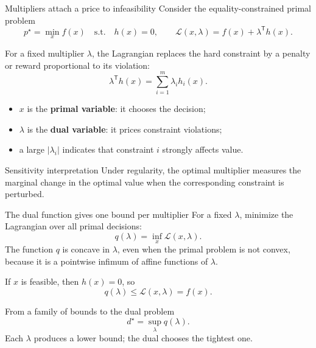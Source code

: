 \documentclass[aspectratio=169,11pt]{beamer}
\newcommand{\trans}{^{\mathsf T}}
\begin{document}
\begin{frame}{Multipliers attach a price to infeasibility}
  Consider the equality-constrained primal problem
  \[
    p^\star=\min_x f(x)
    \quad\text{s.t.}\quad h(x)=0,
    \qquad \mathcal L(x,\lambda)=f(x)+\lambda\trans h(x).
  \]

  For a fixed multiplier $\lambda$, the Lagrangian replaces the hard constraint
  by a penalty or reward proportional to its violation:
  \[
    \lambda\trans h(x)=\sum_{i=1}^m\lambda_i h_i(x).
  \]

  \begin{itemize}
    \item $x$ is the \textbf{primal variable}: it chooses the decision;
    \item $\lambda$ is the \textbf{dual variable}: it prices constraint violations;
    \item a large $|\lambda_i|$ indicates that constraint $i$ strongly affects value.
  \end{itemize}

  \begin{block}{Sensitivity interpretation}
    Under regularity, the optimal multiplier measures the marginal change in the
    optimal value when the corresponding constraint is perturbed.
  \end{block}
\end{frame}

\begin{frame}{The dual function gives one bound per multiplier}
  For a fixed $\lambda$, minimize the Lagrangian over all primal decisions:
  \[
    \boxed{q(\lambda)=\inf_x \mathcal L(x,\lambda).}
  \]
  The function $q$ is concave in $\lambda$, even when the primal problem is not
  convex, because it is a pointwise infimum of affine functions of $\lambda$.

  If $x$ is feasible, then $h(x)=0$, so
  \[
    q(\lambda)
    \leq \mathcal L(x,\lambda)
    =f(x).
  \]

  \begin{block}{From a family of bounds to the dual problem}
    \[
      \boxed{d^\star=\sup_\lambda q(\lambda).}
    \]
    Each $\lambda$ produces a lower bound; the dual chooses the tightest one.
  \end{block}
\end{frame}
\end{document}
